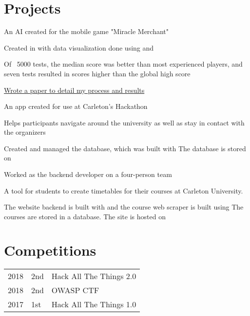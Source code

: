 \documentclass[]{deedy-resume-openfont}
\begin{document}
\begin{minipage}[t]{0.66\textwidth}
\section{Projects}
\begin{tightemize}
\item An AI created for the mobile game "Miracle Merchant"
\item Created in with data visualization done using and 
\item Of ~5000 tests, the median score was better than most experienced players, and seven tests resulted in scores higher than the global high score
\item \href{https://github.com/AngelOnFira/Miracle-Merchant-AI/blob/master/Miracle_Merchant.pdf}{Wrote a paper to detail my process and results}
\end{tightemize}
\sectionsep
{}
\begin{tightemize}
\item An app created for use at Carleton’s Hackathon
\item Helps participants navigate around the university as well as stay in contact with the organizers
\item Created and managed the database, which was built with  The database is stored on 
\item Worked as the backend developer on a four-person team
\end{tightemize}
\sectionsep
{}
\begin{tightemize}
\item A tool for students to create timetables for their courses at Carleton University.
\item The website backend is built with  and the course web scraper is built using The courses are stored in a database. The site is hosted on 
\end{tightemize}
\sectionsep
\section{Competitions} 
\begin{tabular}{rll}
2018	     & 2nd & Hack All The Things 2.0\\
2018	     & 2nd & OWASP CTF\\
2017	     & 1st & Hack All The Things 1.0\\
\end{tabular}
\sectionsep
\end{minipage} 
\end{document}
